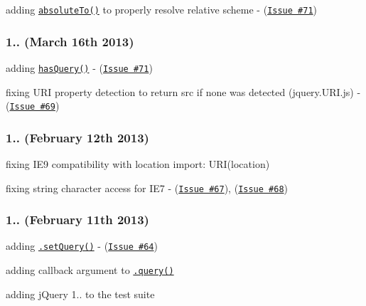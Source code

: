 \begin{DoxyItemize}
\item adding \href{http://medialize.github.io/URI.js/docs.html#absoluteto}{\tt {\ttfamily absolute\+To()}} to properly resolve relative scheme -\/ (\href{https://github.com/medialize/URI.js/issues/73}{\tt Issue \#71})
\end{DoxyItemize}

\subsubsection*{1.. (March 16th 2013)}


\begin{DoxyItemize}
\item adding \href{http://medialize.github.io/URI.js/docs.html#search-has}{\tt {\ttfamily has\+Query()}} -\/ (\href{https://github.com/medialize/URI.js/issues/71}{\tt Issue \#71})
\item fixing U\+RI property detection to return \textquotesingle{}src\textquotesingle{} if none was detected ({\ttfamily jquery.\+U\+R\+I.\+js}) -\/ (\href{https://github.com/medialize/URI.js/issues/69}{\tt Issue \#69})
\end{DoxyItemize}

\subsubsection*{1.. (February 12th 2013)}


\begin{DoxyItemize}
\item fixing I\+E9 compatibility with location import\+: {\ttfamily U\+R\+I(location)}
\item fixing string character access for I\+E7 -\/ (\href{https://github.com/medialize/URI.js/issues/67}{\tt Issue \#67}), (\href{https://github.com/medialize/URI.js/issues/68}{\tt Issue \#68})
\end{DoxyItemize}

\subsubsection*{1.. (February 11th 2013)}


\begin{DoxyItemize}
\item adding \href{http://medialize.github.io/URI.js/docs.html#search-set}{\tt {\ttfamily .set\+Query()}} -\/ (\href{https://github.com/medialize/URI.js/issues/64}{\tt Issue \#64})
\item adding callback argument to \href{http://medialize.github.io/URI.js/docs.html#accessors-search}{\tt {\ttfamily .query()}}
\item adding j\+Query 1.. to the test suite
\end{DoxyItemize}

